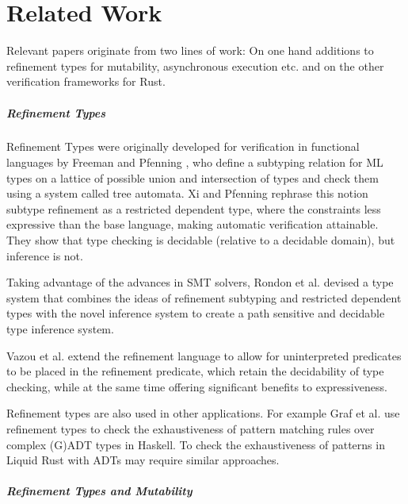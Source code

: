 
\chapter{Related Work} \label{ch:related-work}

Relevant papers originate from two lines of work: On one hand additions to refinement types for mutability, asynchronous execution etc. and on the other verification frameworks for Rust.




\paragraph*{Refinement Types} Refinement Types were originally developed for verification in functional languages by Freeman and Pfenning \cite{freeman_refinement_1991}, who define a subtyping relation for ML types on a lattice of possible union and intersection of types and check them using a system called tree automata. 
Xi and Pfenning \cite{xi_dependent_1999} rephrase this notion subtype refinement as a restricted dependent type, where the constraints less expressive than the base language, making automatic verification attainable. They show that type checking is decidable (relative to a decidable domain), but inference is not.

Taking advantage of the advances in SMT solvers, Rondon et al. \cite{rondon_liquid_2008} devised a type system that combines the ideas of refinement subtyping and restricted dependent types with the novel inference system to create a path sensitive and decidable type inference system.

Vazou et al. \cite{vazou_abstract_2013} extend the refinement language to allow for uninterpreted predicates to be placed in the refinement predicate, which retain the decidability of type checking, while at the same time offering significant benefits to expressiveness. 


Refinement types are also used in other applications. For example Graf et al. \cite{graf_lower_2020} use refinement types to check the exhaustiveness of pattern matching rules over complex (G)ADT types in Haskell. To check the exhaustiveness of patterns in Liquid Rust with ADTs may require similar approaches.

\paragraph*{Refinement Types and Mutability} 

